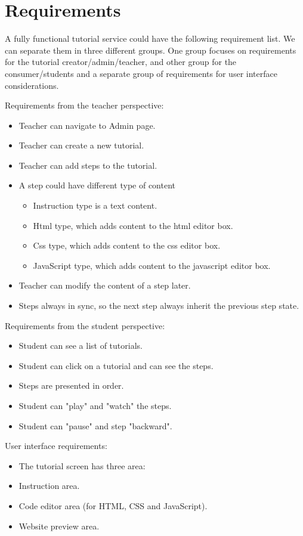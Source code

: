 \documentclass[12pt, a4paper, oneside, openright, medskipamount]{report}
\begin{document}
\section{Requirements}

A fully functional tutorial service could have the following requirement list. We can separate them in three different groups. One group focuses on requirements for the tutorial creator/admin/teacher, and other group for the consumer/students and a separate group of requirements for user interface considerations.

\noindent Requirements from the teacher perspective:
\begin{itemize}[noitemsep]
\item Teacher can navigate to Admin page.
\item Teacher can create a new tutorial.
\item Teacher can add steps to the tutorial.
\item A step could have different type of content
\begin{itemize}[noitemsep]
\item Instruction type is a text content.
\item Html type, which adds content to the html editor box.
\item Css type, which adds content to the css editor box.
\item JavaScript type, which adds content to the javascript editor box.
\end{itemize}
\item Teacher can modify the content of a step later.
\item Steps always in sync, so the next step always inherit the previous step state.
\end{itemize}

\noindent Requirements from the student perspective:
\begin{itemize}[noitemsep]
\item Student can see a list of tutorials.
\item Student can click on a tutorial and can see the steps.
\item Steps are presented in order.
\item Student can "play" and "watch" the steps.
\item Student can "pause" and step "backward".
\end{itemize}

\noindent User interface requirements:
\begin{itemize}[noitemsep]
\item The tutorial screen has three area:
\item Instruction area.
\item Code editor area (for HTML, CSS and JavaScript).
\item Website preview area.
\end{itemize}
\end{document}
